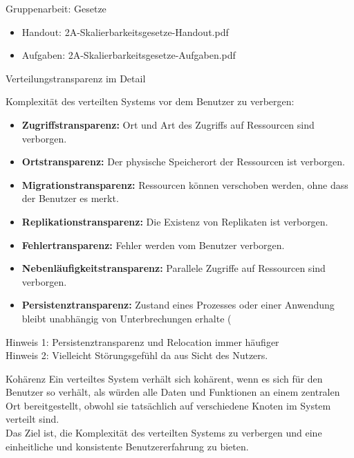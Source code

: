 \documentclass{beamer}
\begin{document}
\begin{frame}{Gruppenarbeit: Gesetze}
      \begin{itemize}
        \item Handout:  2A-Skalierbarkeitsgesetze-Handout.pdf
        \item Aufgaben: 2A-Skalierbarkeitsgesetze-Aufgaben.pdf    
      \end{itemize}
\end{frame}


\begin{frame}{Verteilungstransparenz im Detail}

Komplexität des verteilten Systems vor dem Benutzer zu verbergen:

    \begin{itemize}
        \item \textbf{Zugriffstransparenz:}  Ort und Art des Zugriffs auf Ressourcen sind verborgen.
        \item \textbf{Ortstransparenz:} Der physische Speicherort der Ressourcen ist verborgen.
        \item \textbf{Migrationstransparenz:}  Ressourcen können verschoben werden, ohne dass der Benutzer es merkt.
        \item \textbf{Replikationstransparenz:}  Die Existenz von Replikaten ist verborgen.
        \item \textbf{Fehlertransparenz:}  Fehler werden vom Benutzer verborgen.
        \item \textbf{Nebenläufigkeitstransparenz:} Parallele Zugriffe auf Ressourcen sind verborgen.
        \item \textbf{Persistenztransparenz: }  Zustand eines Prozesses oder einer Anwendung bleibt unabhängig von Unterbrechungen erhalte (
    \end{itemize}
    Hinweis 1: Persistenztransparenz und Relocation immer häufiger\mbox{}\\
    Hinweis 2: Vielleicht Störungsgefühl da aus Sicht des Nutzers. \mbox{}\\
\end{frame}


\begin{frame}{Kohärenz}
  Ein verteiltes System verhält sich kohärent, wenn es sich für den Benutzer so verhält, als würden alle Daten und Funktionen an einem zentralen Ort bereitgestellt, obwohl sie tatsächlich auf verschiedene Knoten im System verteilt sind. 
  \mbox{}\\
  Das Ziel ist, die Komplexität des verteilten Systems zu verbergen und eine einheitliche und konsistente Benutzererfahrung zu bieten.
\end{frame}
\end{document}
